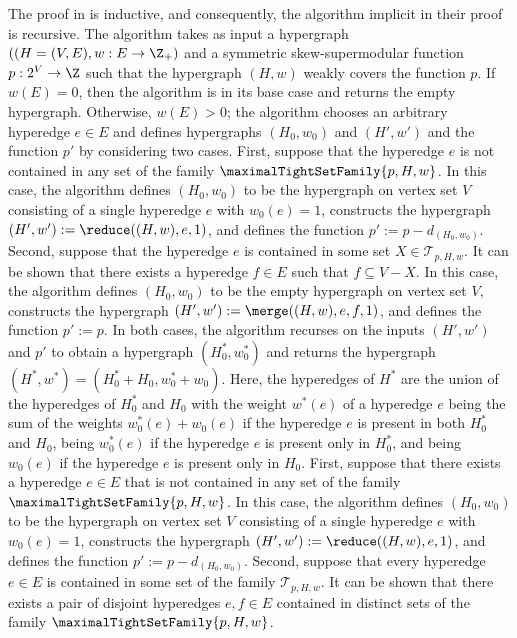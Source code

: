 The proof in \cite{Bernath-Kiraly} is inductive, and consequently, the algorithm implicit in their proof is recursive. The algorithm takes as input a hypergraph $((H=(V, E), w: E\rightarrow \Z_+)$ and a symmetric skew-supermodular function $p: 2^V\rightarrow \Z$ such that the hypergraph $(H,w)$ weakly covers the function $p$. 
If $w(E) = 0$, then the algorithm is in its base case and returns the empty hypergraph. 
Otherwise, $w(E) > 0$; the algorithm chooses an arbitrary hyperedge $e \in E$ and defines hypergraphs $(H_0, w_0)$ and $(H', w')$ and the function $p'$ by considering two cases.
First, suppose that the hyperedge $e$ is not contained in any set of the family $\maximalTightSetFamily{p, H, w}$. 
In this case, the algorithm defines $(H_0, w_0)$ to be the hypergraph on vertex set $V$ consisting of a single hyperedge $e$ with $w_0(e) = 1$, constructs the hypergraph $(H', w'):=\reduce((H, w), e, 1)$, and defines the function $p' := p - d_{(H_0, w_0)}$. Second, suppose that the hyperedge $e$ is contained in some set $X \in \mathcal{T}_{p, H, w}$. It can be shown that there exists a hyperedge $f \in E$ such that $f \subseteq V - X$. In this case, the algorithm defines $(H_0, w_0)$ to be the empty hypergraph on vertex set $V$, constructs the hypergraph $(H', w'):=\merge((H, w), e, f, 1)$, and defines the function $p' := p$. In both cases, the algorithm recurses on the inputs $(H',w')$ and $p'$ to obtain a hypergraph $(H^*_0, w^*_0)$ and returns the hypergraph $(H^*, w^*) = (H^*_0 + H_0, w^*_0 + w_0)$. 
Here, the hyperedges of $H^*$ are the union of the hyperedges of $H^*_0$ and $H_0$ with the weight $w^*(e)$ of a hyperedge $e$ being the sum of the weights $w^*_0(e)+w_0(e)$ if the hyperedge $e$ is present in both $H^*_0$ and $H_0$, being $w^*_0(e)$ if the hyperedge $e$ is present only in $H^*_0$, and being $w_0(e)$ if the hyperedge $e$ is present only in $H_0$. 
\iffalse
{}
First, suppose that there exists a hyperedge $e\in E$ that is not contained in any set of the family $\maximalTightSetFamily{p, H, w}$. 
In this case, the algorithm defines $(H_0, w_0)$ to be the hypergraph on vertex set $V$ consisting of a single hyperedge $e$ with $w_0(e) = 1$,
constructs the hypergraph $(H', w'):=\reduce((H, w), e, 1)$, and defines the function $p' := p - d_{(H_0, w_0)}$.
Second, suppose that every hyperedge $e\in E$ is contained in some set of the family $\mathcal{T}_{p, H, w}$. It can be shown that there exists a pair of disjoint hyperedges $e, f\in E$ contained in distinct sets of the family $\maximalTightSetFamily{p, H, w}$.
